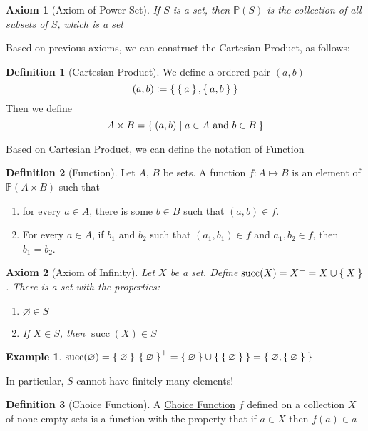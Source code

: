 \documentclass[12pt]{amsart}
\theoremstyle{plain}
\newtheorem {AXM}{Axiom}
\theoremstyle{remark}
\theoremstyle{definition}
\newtheorem*{define}{Definition}
\newtheorem*{eg}{Example}
\begin{document}
\begin{AXM}[Axiom of Power Set]
	If $S$ is a set, then $\mathbb{P}(S)$ is the collection of all subsets of $S$, which is a set	
\end{AXM}

Based on previous axioms, we can construct the Cartesian Product, as follows:
\begin{define}[Cartesian Product]
	We define a ordered pair $(a, b)$
	\begin{equation*}
		(a, b) \vcentcolon = \Set{\Set{a}, \Set{a, b}}
	\end{equation*}
	Then we define
	\begin{equation*}
		A \times B = \Set{(a,b) | a \in A \text{ and } b \in B}
	\end{equation*}
\end{define}

Based on Cartesian Product, we can define the notation of Function
\begin{define}[Function]
	Let $A$, $B$ be sets. A function $f:A \mapsto B$ is an element of $\mathbb{P}(A \times B)$ such that 
	\begin{enumerate}[(1)]
		\item for every $a \in A$, there is some $b \in B$ such that $(a, b) \in f$.
		\item For every $a \in A$, if $b_1$ and $b_2$ such that $(a_1, b_1) \in f$ and $a_1, b_2 \in f$, then $b_1 = b_2$.
	\end{enumerate}
\end{define}

\begin{AXM}[Axiom of Infinity]
	Let $X$ be a set. Define $\operatorname{succ}(X) = X^+ =  X \cup \Set{X}$. 
	\newline
	There is a set with the properties:
	\begin{enumerate}[(1)]
		\item $\varnothing \in S$
		\item If $X \in S$, then $\operatorname{succ}(X) \in S$
	\end{enumerate}
\end{AXM}
\begin{eg}
	\hfill
	\newline
	$\operatorname{succ}(\varnothing) = \Set{\varnothing}$
	\newline
	$\Set{\varnothing}^+ = \Set{\varnothing} \cup \Set{\Set{\varnothing}} = \Set{\varnothing, \Set{\varnothing}}$
\end{eg}
	In particular, $S$ cannot have finitely many elements!
\begin{define}[Choice Function]
	A \ul{Choice Function} $f$ defined on a collection $X$ of none empty sets is a function with the property that if $a \in X$ then $f(a) \in a$
\end{define}
\end{document}
